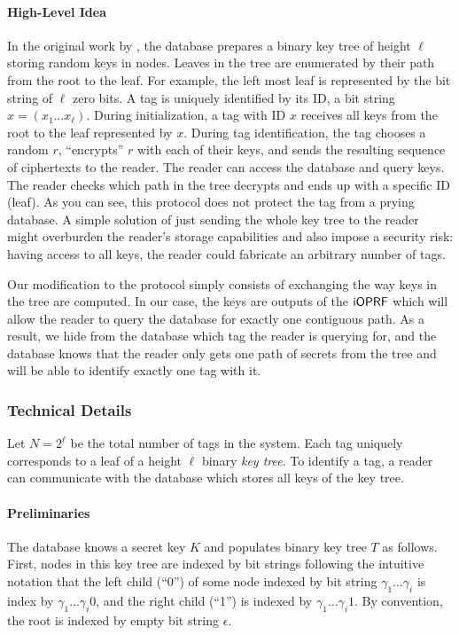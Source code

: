\paragraph{High-Level Idea} In the original work by \citeauthor{molnar}, the
database prepares a binary key tree of height $\ell$ storing random
keys in nodes. Leaves in the tree are enumerated by their path from
the root to the leaf. For example, the left most leaf is represented
by the bit string of $\ell$ zero bits. A tag is uniquely identified by
its ID, a bit string $x=(x_1\ldots{}x_\ell)$. During initialization, a
tag with ID $x$ receives all keys from the root to the leaf
represented by $x$. During tag identification, the tag chooses a
random $r$, ``encrypts'' $r$ with each of their keys, and sends the
resulting sequence of ciphertexts to the reader. The reader can access
the database and query keys. The reader checks which path in the tree
decrypts and ends up with a specific ID (leaf). As you can see, this
protocol does not protect the tag from a prying database. A simple
solution of just sending the whole key tree to the reader might
overburden the reader's storage capabilities and also impose a
security risk: having access to all keys, the reader could fabricate 
an arbitrary number of tags.

Our modification to the \citeauthor{molnar} protocol simply consists
of exchanging the way keys in the tree are computed. In our case, the
keys are outputs of the $\mathsf{i}\mathsf{OPRF}$ which will allow the reader to query
the database for exactly one contiguous path.  As a result, we hide
from the database which tag the reader is querying for, and the
database knows that the reader only gets one path of secrets from the
tree and will be able to identify exactly one tag with it.

\subsubsection{Technical Details}
Let $N=2^\ell$ be the total number of tags in the system. Each tag
uniquely corresponds to a leaf of a height $\ell$ binary \emph{key
tree}. To identify a tag, a reader can communicate with the database
which stores all keys of the key tree.

\paragraph{Preliminaries}
The database knows a secret key $K$ and populates binary key tree
$T$ as follows. First, nodes in this key tree are indexed by bit
strings following the intuitive notation that the left child (``0'')
of some node indexed by bit string $\gamma_1\ldots\gamma_i$ is index by
$\gamma_1\ldots\gamma_i0$, and the right child (``1'') is indexed by
$\gamma_1\ldots\gamma_i1$. By convention, the root is indexed by
empty bit string $\epsilon$.

